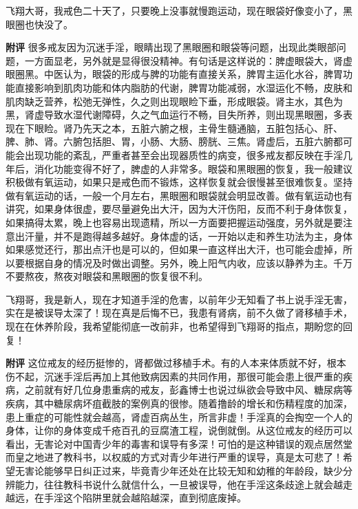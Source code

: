 \begin{case}
    飞翔大哥，我戒色二十天了，只要晚上没事就慢跑运动，现在眼袋好像变小了，黑眼圈也快没了。

    \textbf{附评} 很多戒友因为沉迷手淫，眼睛出现了黑眼圈和眼袋等问题，出现此类眼部问题，一方面显老，另外就是显得很没精神。有句话是这样说的：脾虚眼袋大，肾虚眼圈黑。中医认为，眼袋的形成与脾的功能有直接关系，脾胃主运化水谷，脾胃功能直接影响到肌肉功能和体内脂肪的代谢，脾胃功能减弱，水湿运化不畅，皮肤和肌肉缺乏营养，松弛无弹性，久之则出现眼睑下垂，形成眼袋。肾主水，其色为黑，肾虚导致水湿代谢障碍，久之气血运行不畅，目失所养，则出现黑眼圈，多表现在下眼睑。肾乃先天之本，五脏六腑之根，主骨生髓通脑，五脏包括心、肝、脾、肺、肾。六腑包括胆、胃，小肠、大肠、膀胱、三焦。肾虚后，五脏六腑都可能会出现功能的紊乱，严重者甚至会出现器质性的病变，很多戒友都反映在手淫几年后，消化功能变得不好了，脾虚的人非常多。眼袋和黑眼圈的恢复，我一般建议积极做有氧运动，如果只是戒色而不锻炼，这样恢复就会很慢甚至很难恢复。坚持做有氧运动的话，一般一个月左右，黑眼圈和眼袋就会明显改善。做有氧运动也有讲究，如果身体很虚，要尽量避免出大汗，因为大汗伤阳，反而不利于身体恢复，如果搞得太累，晚上也容易出现遗精，所以一方面要把握运动强度，另外就是要注意出汗量，并不是跑得越多越好。身体虚的话，一开始以走和养生功法为主，身体如果感觉还行，那出点汗也是可以的，但如果一直这样出大汗，也可能会虚掉，所以要根据自身的情况及时做出调整。另外，晚上阳气内收，应该以静养为主。千万不要熬夜，熬夜对眼袋和黑眼圈的恢复很不利。
\end{case}

\begin{case}
    飞翔哥，我是新人，现在才知道手淫的危害，以前年少无知看了书上说手淫无害，实在是被误导太深了！现在真是后悔不已，我患有肾病，前不久做了肾移植手术，现在在休养阶段，我希望能彻底一改前非，也希望得到飞翔哥的指点，期盼您的回复！

    \textbf{附评} 这位戒友的经历挺惨的，肾都做过移植手术。有的人本来体质就不好，根本伤不起，沉迷手淫后再加上其他致病因素的共同作用，那很可能会患上很严重的疾病，之前就有好几位身患重病的戒友，彭鑫博士也说过纵欲会导致中风、糖尿病等疾病，其中糖尿病坏疽截肢的案例真的很惨。随着撸龄的增长和伤精程度的加深，患上重症的可能性就会越高，肾虚百病丛生，所言非虚！手淫真的会掏空一个人的身体，让你的身体变成千疮百孔的豆腐渣工程，说倒就倒。从这位戒友的经历可以看出，无害论对中国青少年的毒害和误导有多深！可怕的是这种错误的观点居然堂而皇之地进了教科书，以权威的方式对青少年进行严重的误导，真是太可悲了！希望无害论能够早日纠正过来，毕竟青少年还处在比较无知和幼稚的年龄段，缺少分辨能力，往往教科书说什么就信什么，一旦被误导，他在手淫这条歧途上就会越走越远，在手淫这个陷阱里就会越陷越深，直到彻底废掉。
\end{case}

